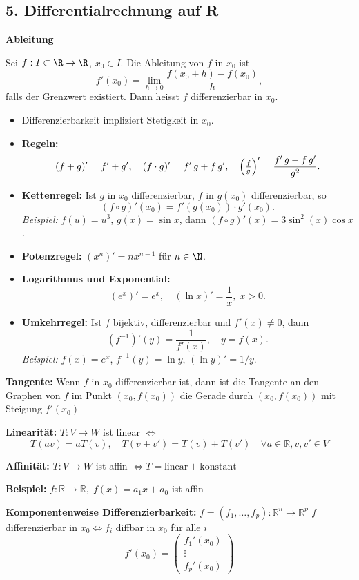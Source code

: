 \subsection{5. Differentialrechnung auf R}
\textbf{Ableitung}
\begin{definition}
  Sei $f:I\subset\R\to\R$, $x_0\in I$. Die Ableitung von $f$ in $x_0$ ist
  \[
    f'(x_0) = \lim_{h\to0} \frac{f(x_0 + h) - f(x_0)}{h},
  \]
  falls der Grenzwert existiert. Dann heisst $f$ differenzierbar in $x_0$.
\end{definition}
\begin{itemize}
  \item Differenzierbarkeit impliziert Stetigkeit in $x_0$.
  \item \textbf{Regeln:}
    \[
      (f+g)' = f' + g', \quad 
      (f\cdot g)' = f'\,g + f\,g', \quad
      \Bigl(\tfrac{f}{g}\Bigr)' = \frac{f'\,g - f\,g'}{g^2}.
    \]
  \item \textbf{Kettenregel:} Ist $g$ in $x_0$ differenzierbar, $f$ in $g(x_0)$ differenzierbar, so
    \[
      (f\circ g)'(x_0) = f'(g(x_0)) \cdot g'(x_0).
    \]
    \emph{Beispiel:} $f(u)=u^3$, $g(x)=\sin x$, dann $(f\circ g)'(x)=3\sin^2(x)\cos x$.
  \item \textbf{Potenzregel:} $(x^n)' = n x^{n-1}$ für $n\in\N$.
  \item \textbf{Logarithmus und Exponential:}  
    \[
      (e^x)' = e^x,\quad (\ln x)' = \frac{1}{x},\; x>0.
    \]
  \item \textbf{Umkehrregel:} Ist $f$ bijektiv, differenzierbar und $f'(x)\ne0$, dann
    \[
      (f^{-1})'(y) = \frac{1}{f'(x)},\quad y = f(x).
    \]
    \emph{Beispiel:} $f(x)=e^x$, $f^{-1}(y)=\ln y$, $(\ln y)' = 1/y$.
\end{itemize}

\textbf{Tangente:}  
Wenn \(f\) in \(x_0\) differenzierbar ist, dann ist die Tangente an den Graphen von \(f\) im Punkt \((x_0, f(x_0))\)  
die Gerade durch \((x_0, f(x_0))\) mit Steigung \(f'(x_0)\)

\textbf{Linearität:}  
\(T: V \to W\) ist linear \(\Leftrightarrow\)  
\[
T(av) = aT(v), \quad T(v + v') = T(v) + T(v')\quad \forall a \in \mathbb{R}, v, v' \in V
\]

\textbf{Affinität:}  
\(T: V \to W\) ist affin \(\Leftrightarrow T = \text{linear} + \text{konstant}\)

\textbf{Beispiel:} \(f: \mathbb{R} \to \mathbb{R},\; f(x) = a_1 x + a_0\) ist affin

\textbf{Komponentenweise Differenzierbarkeit:}  
\(f = (f_1, \dots, f_p): \mathbb{R}^n \to \mathbb{R}^p\)  
\(f\) differenzierbar in \(x_0 \Leftrightarrow f_i\) diffbar in \(x_0\) für alle \(i\)  
\[
f'(x_0) = \begin{pmatrix} f_1'(x_0) \\ \vdots \\ f_p'(x_0) \end{pmatrix}
\]

